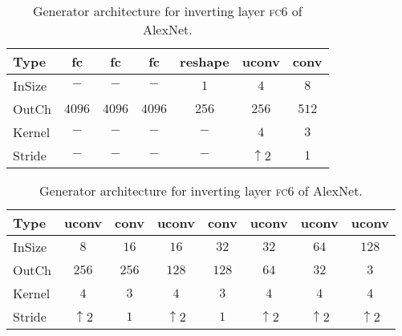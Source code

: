 \documentclass{article}
\newcommand{\fc}{\textsc{fc}}
\begin{document}
\begin{table}
   \begin{center}
   \setlength{\tabcolsep}{0.15cm}
  \small{
  \begin{tabular}{|l|cccccc|}
      \hline
      \small{Type}   & fc     & fc     & fc     & reshape & uconv         & conv  \\ \hline
      \small{InSize} & $-$    & $-$    & $-$    & $1$     & $4$            & $8$   \\
      \small{OutCh}  & $4096$ & $4096$ & $4096$ & $256$   & $256$          & $512$ \\
      \small{Kernel} & $-$    & $-$    & $-$    & $-$     & $4$            & $3$   \\
      \small{Stride} & $-$    & $-$    & $-$    & $-$     & $\uparrow \!2$ & $1$   \\
      \hline
    \end{tabular}}
\vspace{0.1cm}
   \setlength{\tabcolsep}{0.1cm}
  \small{
  \begin{tabular}{|l|ccccccc|}
      \hline
      \small{Type}   & uconv            & conv  & uconv          & conv  & uconv          & uconv            & uconv          \\ \hline
      \small{InSize} & $8$              & $16$  & $16$           & $32$  & $32$           & $64$             & $128$          \\
      \small{OutCh}  & $256$            & $256$ & $128$          & $128$ & $64$           & $32$             & $3$          \\
      \small{Kernel} & $4$              & $3$   & $4$            & $3$   & $4$            & $4$              & $4$            \\
      \small{Stride} & $\uparrow \!2$   & $1$   & $\uparrow \!2$ & $1$   & $\uparrow \!2$ & $\uparrow \!2$   & $\uparrow \!2$ \\
      \hline
    \end{tabular}}
  \end{center}
  \caption{Generator architecture for inverting layer \fc6 of AlexNet. }
  \label{tbl:generator_arch}
\end{table}
\end{document}
